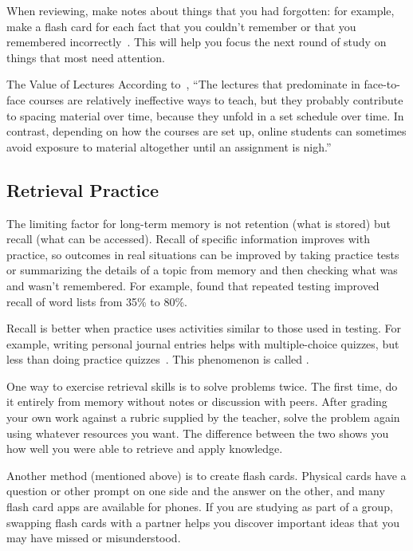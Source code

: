 When reviewing,
make notes about things that you had forgotten:
for example,
make a flash card for each fact that you couldn't remember
or that you remembered incorrectly~\cite{Matt2019}.
This will help you focus the next round of study on things that most need attention.

\begin{aside}{The Value of Lectures}
  According to~\cite{Mill2016a},
  ``The lectures that predominate in face-to-face courses are relatively ineffective ways to teach,
  but they probably contribute to spacing material over time,
  because they unfold in a set schedule over time.
  In contrast,
  depending on how the courses are set up,
  online students can sometimes avoid exposure to material altogether until an assignment is nigh.''
\end{aside}

\subsection*{Retrieval Practice}

The limiting factor for long-term memory is not retention (what is stored)
but recall (what can be accessed).
Recall of specific information improves with practice,
so outcomes in real situations can be improved
by taking practice tests or summarizing the details of a topic from memory
and then checking what was and wasn't remembered.
For example,
\cite{Karp2008} found that repeated testing improved recall of word lists from 35\% to 80\%.

Recall is better when practice uses activities similar to those used in testing.
For example,
writing personal journal entries helps with multiple-choice quizzes,
but less than doing practice quizzes~\cite{Mill2016a}.
This phenomenon is called
.

One way to exercise retrieval skills is to solve problems twice.
The first time,
do it entirely from memory without notes or discussion with peers.
After grading your own work against a rubric supplied by the teacher,
solve the problem again using whatever resources you want.
The difference between the two shows you how well you were able to retrieve and apply knowledge.

Another method (mentioned above) is to create flash cards.
Physical cards have a question or other prompt on one side and the answer on the other,
and many flash card apps are available for phones.
If you are studying as part of a group,
swapping flash cards with a partner
helps you discover important ideas that you may have missed or misunderstood.

